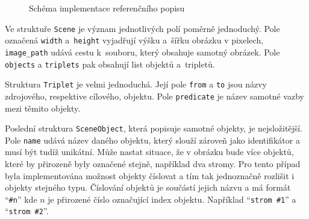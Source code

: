 \begin{figure}[ht!]
	\caption{Schéma implementace referenčního popisu}\label{fig:schema_impl_ref_popis}
\end{figure}

Ve struktuře \texttt{Scene} je význam jednotlivých polí poměrně jednoduchý.
Pole označená \texttt{width} a~\texttt{height} vyjadřují výšku a~šířku obrázku v pixelech, \texttt{image\_path} udává cestu k~souboru, který obsahuje samotný obrázek.
Pole \texttt{objects} a \texttt{triplets} pak obsahují list objektů a~tripletů.

Struktura \texttt{Triplet} je velmi jednoduchá.
Její pole \texttt{from} a \texttt{to} jsou názvy zdrojového, respektive cílového, objektu.
Pole \texttt{predicate} je název samotné vazby mezi těmito objekty.

Poslední struktura \texttt{SceneObject}, která popisuje samotné objekty, je nejsložitější.
Pole \texttt{name} udává název daného objektu, který slouží zároveň jako identifikátor a musí být tudíž unikátní.
Může nastat situace, že v obrázku bude více objektů, které by přirozeně byly označené stejně, například dva stromy.
Pro tento případ byla implementována možnost objekty číslovat a tím tak jednoznačně rozlišit i objekty stejného typu.
Číslování objektů je součástí jejich názvu a má formát \enquote{\texttt{\#n}} kde $n$ je přirozené číslo označující index objektu.
Například \enquote{\texttt{strom \#1}} a \enquote{\texttt{strom \#2}}.

